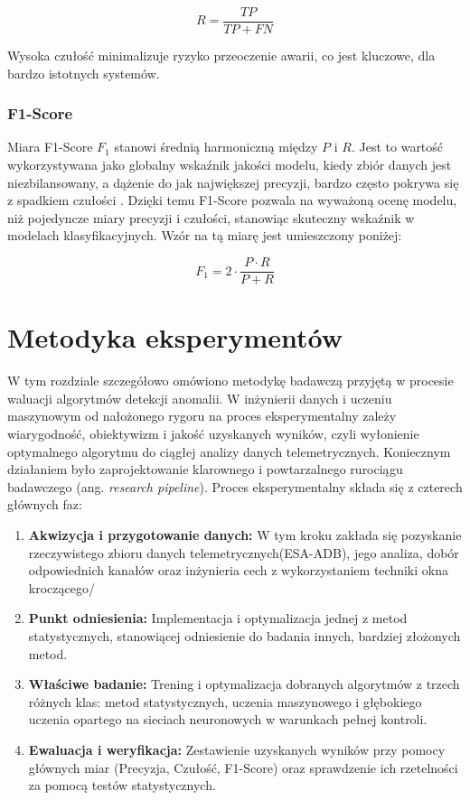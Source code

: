 \documentclass[a4paper,twoside,12pt]{book}
\newcommand{\obcy}[1]{\emph{#1}}
\newcommand{\english}[1]{{\selectlanguage{british}\obcy{#1}}}
\begin{document}
	\begin{equation}
		R = \frac{TP}{TP + FN}
		\label{eq:recall}
	\end{equation} 
	
	Wysoka czułość minimalizuje ryzyko przeoczenie awarii, co jest kluczowe, dla bardzo istotnych systemów.

	
	\subsection{F1-Score}
	
	Miara F1-Score $F_1$ stanowi średnią harmoniczną między $P$ i $R$. Jest to wartość wykorzystywana jako globalny wskaźnik jakości modelu, kiedy zbiór danych jest niezbilansowany, a dążenie do jak największej precyzji, bardzo często pokrywa się z spadkiem czułości \cite{sathyanarayanan2024confusion}. Dzięki temu  F1-Score pozwala na wyważoną ocenę modelu, niż pojedyncze miary precyzji i czułości, stanowiąc skuteczny wskaźnik w modelach klasyfikacyjnych. Wzór na tą miarę jest umieszczony poniżej:
	
	\begin{equation}
		F_1 = 2 \cdot \frac{P \cdot R}{P + R}
		\label{eq:f1score}
	\end{equation}
	

	
	\chapter{Metodyka eksperymentów} 
	
	W tym rozdziale szczegółowo omówiono metodykę badawczą przyjętą w procesie waluacji algorytmów detekcji anomalii. W inżynierii danych i uczeniu maszynowym od nałożonego rygoru na proces eksperymentalny zależy wiarygodność, obiektywizm i jakość uzyskanych wyników, czyli wyłonienie optymalnego algorytmu do ciągłej analizy danych telemetrycznych. Koniecznym działaniem było zaprojektowanie klarownego i powtarzalnego rurociągu badawczego (ang. \english{research pipeline}).
	Proces eksperymentalny składa się z czterech głównych faz:
	\begin{enumerate}
		\item \textbf{Akwizycja i przygotowanie danych:} W tym kroku zakłada się pozyskanie rzeczywistego zbioru danych telemetrycznych(ESA-ADB), jego analiza, dobór odpowiednich kanałów oraz inżynieria cech z wykorzystaniem techniki okna kroczącego/
		\item \textbf {Punkt odniesienia:} Implementacja i optymalizacja jednej z metod statystycznych, stanowiącej odniesienie do badania innych, bardziej złożonych metod.
		\item \textbf{Właściwe badanie:} Trening i optymalizacja dobranych algorytmów z trzech różnych klas: metod statystycznych, uczenia maszynowego i głębokiego uczenia opartego na sieciach neuronowych w warunkach pełnej kontroli.
		\item \textbf {Ewaluacja i weryfikacja:} Zestawienie uzyskanych wyników przy pomocy głównych miar (Precyzja, Czułość, F1-Score) oraz sprawdzenie ich rzetelności za pomocą testów statystycznych.
	\end{enumerate}
	
\end{document}
